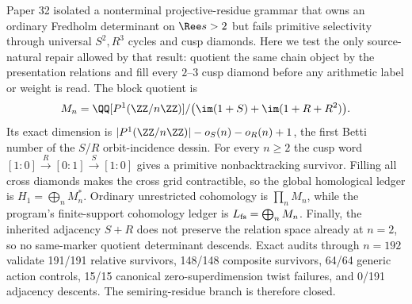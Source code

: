 Paper 32 isolated a nonterminal projective-residue grammar that owns an
ordinary Fredholm determinant on $\Ree s>2$ but fails primitive selectivity
through universal $S^2,R^3$ cycles and cusp diamonds.  Here we test the only
source-natural repair allowed by that result: quotient the same chain object
by the presentation relations and fill every $2$--$3$ cusp diamond before any
arithmetic label or weight is read.  The block quotient is
\[
  M_n=\QQ[P^1(\ZZ/n\ZZ)]/
  \bigl(\im(1+S)+\im(1+R+R^2)\bigr).
\]
Its exact dimension is
$|P^1(\ZZ/n\ZZ)|-o_S(n)-o_R(n)+1$, the first Betti number of the
$S$/$R$ orbit-incidence dessin.  For every $n\ge2$ the cusp word
$[1:0]\xrightarrow{R}[0:1]\xrightarrow{S}[1:0]$ gives a primitive
nonbacktracking survivor.  Filling all cross diamonds makes the cross grid
contractible, so the global homological ledger is
$H_1=\bigoplus_n M_n^*$.  Ordinary unrestricted cohomology is
$\prod_n M_n$, while the program's finite-support cohomology ledger is
$L_{\rm fs}=\bigoplus_n M_n$.  Finally, the inherited adjacency $S+R$ does not
preserve the relation space already at $n=2$, so no same-marker quotient
determinant descends.  Exact audits through $n=192$ validate 191/191 relative survivors,
148/148 composite survivors, 64/64 generic action controls, 15/15 canonical
zero-superdimension twist failures, and 0/191 adjacency descents.  The
semiring-residue branch is therefore closed.
